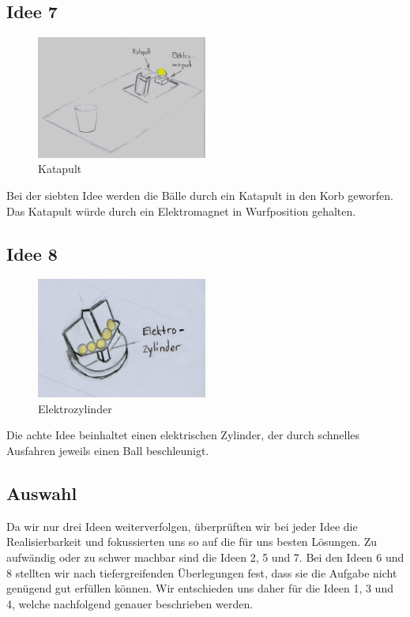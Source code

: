 \subsection{Idee 7}
\begin{figure}[h!]
	\centering
	\includegraphics[width=0.5\textwidth]{../../fig/EM-Katapult.jpg}
	\caption{Katapult}
	\label{fig:katapult}
\end{figure}
Bei der siebten Idee werden die Bälle durch ein Katapult in den Korb geworfen. Das Katapult würde durch ein Elektromagnet in Wurfposition gehalten.

\subsection{Idee 8}
\begin{figure}[h!]
	\centering
	\includegraphics[width=0.5\textwidth]{../../fig/Elektrozylindergeraet.jpg}
	\caption{Elektrozylinder}
	\label{fig:elektrozylinder}
\end{figure}
Die achte Idee beinhaltet einen elektrischen Zylinder, der durch schnelles Ausfahren jeweils einen Ball beschleunigt.

\subsection{Auswahl}
Da wir nur drei Ideen weiterverfolgen, überprüften wir bei jeder Idee die Realisierbarkeit und fokussierten uns so auf die für uns besten Lösungen.
Zu aufwändig oder zu schwer machbar sind die Ideen 2, 5 und 7. Bei den Ideen 6 und 8 stellten wir nach tiefergreifenden Überlegungen fest, dass sie die Aufgabe nicht genügend gut erfüllen können.
Wir entschieden uns daher für die Ideen 1, 3 und 4, welche nachfolgend genauer beschrieben werden.